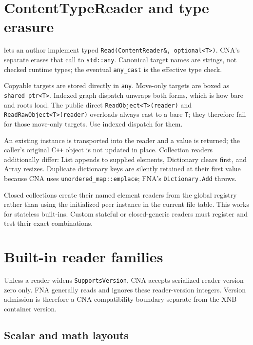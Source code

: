 \section{ContentTypeReader and type erasure}
\label{sec:content-type-reader-contract}

 lets an author implement typed
\texttt{Read(ContentReader\&, optional<T>)}. CNA's separate
 erases that call to \texttt{std::any}. Canonical target names
are strings, not checked runtime types; the eventual \texttt{any\_cast} is the effective type
check.

Copyable targets are stored directly in \texttt{any}. Move-only targets are boxed as
\texttt{shared\_ptr<T>}. Indexed graph dispatch unwraps both forms, which is how bare
 and  roots load. The public direct
\texttt{ReadObject<T>(reader)} and \texttt{ReadRawObject<T>(reader)} overloads always cast to a
bare \texttt{T}; they therefore fail for those move-only targets. Use indexed dispatch for them.

An existing instance is transported into the reader and a value is returned; the caller's
original C\texttt{++} object is not updated in place. Collection readers additionally differ:
List appends to supplied elements, Dictionary clears first, and Array resizes. Duplicate
dictionary keys are silently retained at their first value because CNA uses
\texttt{unordered\_map::emplace}; FNA's \texttt{Dictionary.Add} throws.

Closed collections create their named element readers from the global registry rather than using
the initialized peer instance in the current file table. This works for stateless built-ins.
Custom stateful or closed-generic readers must register and test their exact combinations.

\section{Built-in reader families}

Unless a reader widens \texttt{SupportsVersion}, CNA accepts serialized reader version zero only.
FNA generally reads and ignores these reader-version integers. Version admission is therefore a
CNA compatibility boundary separate from the XNB container version.

\subsection{Scalar and math layouts}
\label{sec:xnb-scalar-math-reader-contract}

